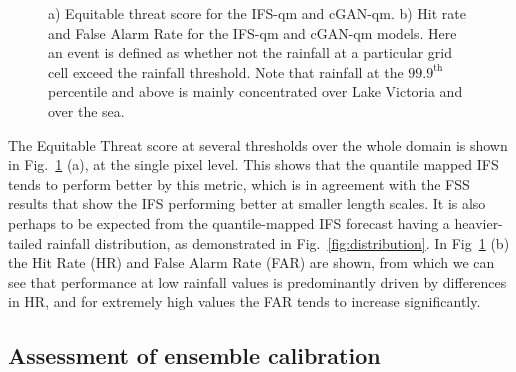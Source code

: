 \documentclass{article}
\begin{document}
\begin{figure}[ht]
\begin{subfigure}[t]{0.49\textwidth}
     \caption{}
     \end{subfigure}
     \caption{ a) Equitable threat score for the IFS-qm and cGAN-qm. b) Hit rate and False Alarm Rate for the IFS-qm and cGAN-qm models. Here an event is defined as whether not the rainfall at a particular grid cell exceed the rainfall threshold. Note that rainfall at the $99.9^{\text{th}}$ percentile and above is mainly concentrated over Lake Victoria and over the sea.}
     \label{fig:ets}
\end{figure}


The Equitable Threat score at several thresholds over the whole domain is shown in Fig.~\ref{fig:ets} (a), at the single pixel level. This shows that the quantile mapped IFS tends to perform better by this metric, which is in agreement with the FSS results that show the IFS performing better at smaller length scales. It is also perhaps to be expected from the quantile-mapped IFS forecast having a heavier-tailed rainfall distribution, as demonstrated in Fig.~\ref{fig:distribution}. In Fig~\ref{fig:ets} (b) the Hit Rate (HR) and False Alarm Rate (FAR) are shown, from which we can see that performance at low rainfall values is predominantly driven by differences in HR, and for extremely high values the FAR tends to increase significantly.







        
\subsection{Assessment of ensemble calibration}
\end{document}
